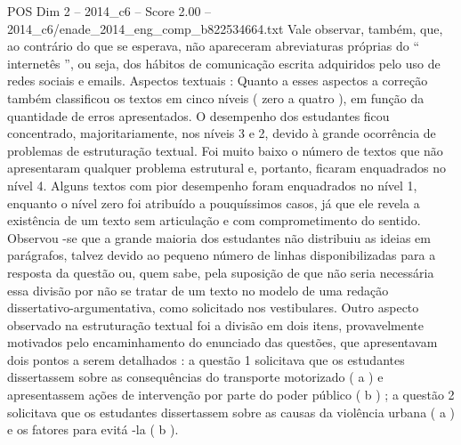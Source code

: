 \begin{textsample}{POS Dim 2 – 2014\_c6 – Score 2.00 – 2014\_c6/enade\_2014\_eng\_comp\_b822534664.txt}
Vale observar, também, que, ao contrário do que se esperava, não apareceram abreviaturas próprias do “ internetês ”, ou seja, dos hábitos de comunicação escrita adquiridos pelo uso de redes sociais e emails.
Aspectos textuais : Quanto a esses aspectos a correção também classificou os textos em cinco níveis ( zero a quatro ), em função da quantidade de erros apresentados.
O desempenho dos estudantes ficou concentrado, majoritariamente, nos níveis 3 e 2, devido à grande ocorrência de problemas de estruturação textual.
Foi muito baixo o número de textos que não apresentaram qualquer problema estrutural e, portanto, ficaram enquadrados no nível 4.
Alguns textos com pior desempenho foram enquadrados no nível 1, enquanto o nível zero foi atribuído a pouquíssimos casos, já que ele revela a existência de um texto sem articulação e com comprometimento do sentido.
Observou -se que a grande maioria dos estudantes não distribuiu as ideias em parágrafos, talvez devido ao pequeno número de linhas disponibilizadas para a resposta da questão ou, quem sabe, pela suposição de que não seria necessária essa divisão por não se tratar de um texto no modelo de uma redação dissertativo-argumentativa, como solicitado nos vestibulares.
Outro aspecto observado na estruturação textual foi a divisão em dois itens, provavelmente motivados pelo encaminhamento do enunciado das questões, que apresentavam dois pontos a serem detalhados : a questão 1 solicitava que os estudantes dissertassem sobre as consequências do transporte motorizado ( a ) e apresentassem ações de intervenção por parte do poder público ( b ) ; a questão 2 solicitava que os estudantes dissertassem sobre as causas da violência urbana ( a ) e os fatores para evitá -la ( b ).

\end{textsample}
